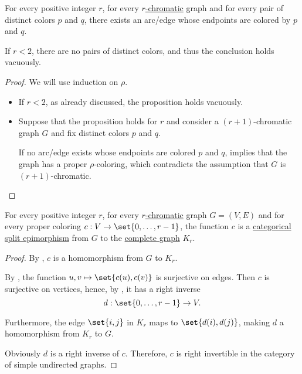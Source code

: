 \begin{proposition}\label{thm:chromatic_number_color_pairs}
  For every positive integer \( r \), for every \hyperref[def:chromatic_number]{\( r \)-chromatic} graph and for every pair of distinct colors \( p \) and \( q \), there exists an arc/edge whose endpoints are colored by \( p \) and \( q \).
\end{proposition}
\begin{comments}
  \item If \( r < 2 \), there are no pairs of distinct colors, and thus the conclusion holds vacuously.
\end{comments}
\begin{proof}
  We will use induction on \( \rho \).
  \begin{itemize}
    \item If \( r < 2 \), as already discussed, the proposition holds vacuously.

    \item Suppose that the proposition holds for \( r \) and consider a \( (r + 1) \)-chromatic graph \( G \) and fix distinct colors \( p \) and \( q \).

    If no arc/edge exists whose endpoints are colored \( p \) and \( q \),  implies that the graph has a proper \( \rho \)-coloring, which contradicts the assumption that \( G \) is \( (r + 1) \)-chromatic.
  \end{itemize}
\end{proof}

\begin{corollary}\label{thm:chromatic_number_coloring_splits}
  For every positive integer \( r \), for every \hyperref[def:chromatic_number]{\( r \)-chromatic} graph \( G = (V, E) \) and for every proper coloring \( c: V \to \set{ 0, \ldots, r - 1 } \), the function \( c \) is a \hyperref[def:morphism_invertibility/right_cancellative]{categorical split epimorphism} from \( G \) to the \hyperref[def:complete_graph]{complete graph} \( K_r \).
\end{corollary}
\begin{proof}
  By , \( c \) is a homomorphism from \( G \) to \( K_r \).

  By , the function \( { u, v } \mapsto \set{ c(u), c(v) } \) is surjective on edges. Then \( c \) is surjective on vertices, hence, by , it has a right inverse
  \begin{equation*}
    d: \set{ 0, \ldots, r - 1 } \to V.
  \end{equation*}

  Furthermore, the edge \( \set{ i, j } \) in \( K_r \) maps to \( \set{ d(i), d(j) } \), making \( d \) a homomorphism from \( K_r \) to \( G \).

  Obviously \( d \) is a right inverse of \( c \). Therefore, \( c \) is right invertible in the category of simple undirected graphs.
\end{proof}

